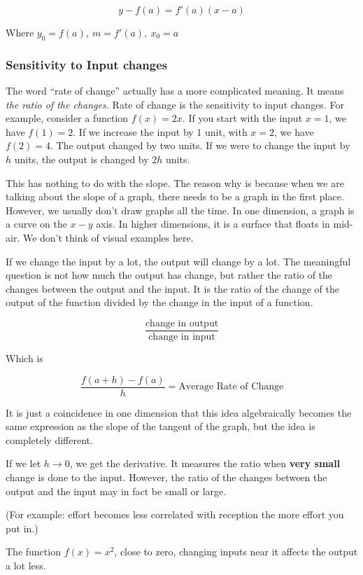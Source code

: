 \documentclass[12pt]{article}
\theoremstyle{plain}
\theoremstyle{remark}
\theoremstyle{definition}
\begin{document}
\[y - f(a) = f'(a)(x - a)\]

Where \(y_{0} = f(a),\ m = f'(a),\ x_{0} = a\)


\subsubsection{Sensitivity to Input
changes}

The word ``rate of change'' actually has a more complicated meaning. It
means \emph{the ratio of the changes.} Rate of change is the sensitivity
to input changes. For example, consider a function \(f(x) = 2x\). If you
start with the input \(x = 1\), we have \(f(1) = 2\). If we increase the
input by 1 unit, with \(x = 2\), we have \(f(2) = 4\). The output
changed by two units. If we were to change the input by \(h\) units, the
output is changed by \(2h\) units.

This has nothing to do with the slope. The reason why is because when we
are talking about the slope of a graph, there needs to be a graph in the
first place. However, we usually don't draw graphs all the time. In one
dimension, a graph is a curve on the \(x - y\) axis. In higher
dimensions, it is a surface that floats in mid-air. We don't think of
visual examples here.

If we change the input by a lot, the output will change by a lot. The
meaningful question is not how much the output has change, but rather
the ratio of the changes between the output and the input. It is the
ratio of the change of the output of the function divided by the change
in the input of a function.

\[\frac{\text{change\ in\ output}}{\text{change\ in\ input}}\]

Which is

\[\frac{f(a + h) - f(a)}{h} = \text{Average\ Rate\ of\ Change}\]

It is just a coincidence in one dimension that this idea algebraically
becomes the same expression as the slope of the tangent of the graph,
but the idea is completely different.

If we let \(h \rightarrow 0\), we get the derivative. It measures the
ratio when \textbf{very small} change is done to the input. However, the
ratio of the changes between the output and the input may in fact be
small or large.

(For example: effort becomes less correlated with reception the more
effort you put in.)

The function \(f(x) = x^{2}\), close to zero, changing inputs near it
affects the output a lot less.
\end{document}
